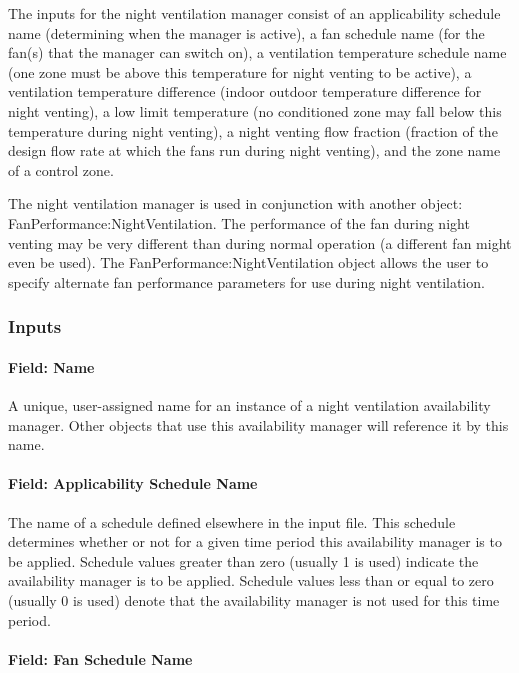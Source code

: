 The inputs for the night ventilation manager consist of an applicability schedule name (determining when the manager is active), a fan schedule name (for the fan(s) that the manager can switch on), a ventilation temperature schedule name (one zone must be above this temperature for night venting to be active), a ventilation temperature difference (indoor outdoor temperature difference for night venting), a low limit temperature (no conditioned zone may fall below this temperature during night venting), a night venting flow fraction (fraction of the design flow rate at which the fans run during night venting), and the zone name of a control zone.

The night ventilation manager is used in conjunction with another object: FanPerformance:NightVentilation. The performance of the fan during night venting may be very different than during normal operation (a different fan might even be used). The FanPerformance:NightVentilation object allows the user to specify alternate fan performance parameters for use during night ventilation.

\subsubsection{Inputs}\label{inputs-9-023}

\paragraph{Field: Name}\label{field-name-8-021}

A unique, user-assigned name for an instance of a night ventilation availability manager. Other objects that use this availability manager will reference it by this name.

\paragraph{Field: Applicability Schedule Name}\label{field-applicability-schedule-name-1}

The name of a schedule defined elsewhere in the input file. This schedule determines whether or not for a given time period this availability manager is to be applied. Schedule values greater than zero (usually 1 is used) indicate the availability manager is to be applied. Schedule values less than or equal to zero (usually 0 is used) denote that the availability manager is not used for this time period.

\paragraph{Field: Fan Schedule Name}\label{field-fan-schedule-name}

